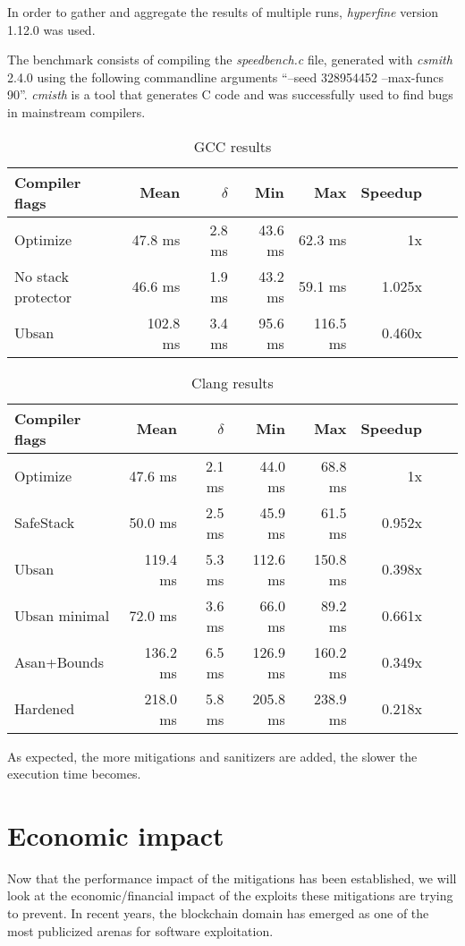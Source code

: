 \documentclass{article}
\begin{document}
In order to gather and aggregate the results of multiple runs, \emph{hyperfine} version 1.12.0 was used.

The benchmark consists of compiling the \emph{speedbench.c} file, generated with \emph{csmith} 2.4.0 using the following commandline arguments ``--seed 328954452 --max-funcs 90''. \emph{cmisth}\cite{csmith} is a tool that generates C code and was successfully used to find bugs in mainstream compilers.

\begin{table}[H]
\centering
\begin{tabular}{|l|r|r|r|r|r|r|r|}
\hline
Compiler flags & Mean & $\delta$ & Min & Max & Speedup \\
\hline
 Optimize &  47.8 ms & 2.8 ms & 43.6 ms & 62.3 ms & 1x \\
 No stack protector&  46.6 ms & 1.9 ms  & 43.2 ms  &  59.1 ms & 1.025x \\
 Ubsan &  102.8 ms & 3.4 ms & 95.6 ms  & 116.5 ms & 0.460x \\
\hline
\end{tabular}
\caption{GCC results}
\label{table:gcc}
\end{table}

\begin{table}[H]
\centering
\begin{tabular}{|l|r|r|r|r|r|r|r|}
\hline
Compiler flags & Mean & $\delta$ & Min & Max & Speedup \\
\hline
  Optimize &  47.6 ms & 2.1 ms & 44.0 ms & 68.8 ms & 1x \\
  SafeStack &  50.0 ms &  2.5 ms & 45.9 ms & 61.5 ms & 0.952x \\
  Ubsan &  119.4 ms & 5.3 ms &  112.6 ms & 150.8 ms & 0.398x \\
  Ubsan minimal & 72.0 ms & 3.6 ms &  66.0 ms& 89.2 ms & 0.661x \\
  Asan+Bounds &  136.2 ms &  6.5 ms&   126.9 ms & 160.2 ms & 0.349x \\
  Hardened & 218.0 ms & 5.8 ms & 205.8 ms & 238.9 ms & 0.218x \\
\hline
\end{tabular}
\caption{Clang results}
\label{table:clang}
\end{table}

As expected, the more mitigations and sanitizers are added, the slower the execution time becomes.

\section{Economic impact}%
Now that the performance impact of the mitigations has been established, we will look at the economic/financial impact of the exploits these mitigations are trying to prevent. In recent years, the blockchain domain has emerged as one of the most publicized arenas for software exploitation.
\end{document}
